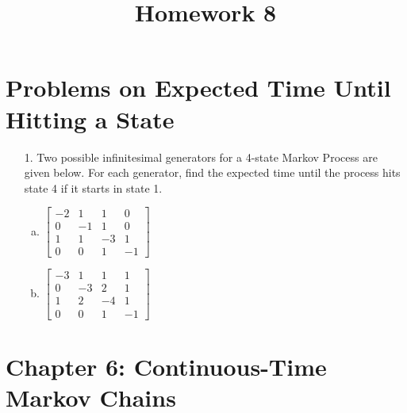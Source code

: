 \documentclass{article}
\begin{document}
\title{Homework 8}
\maketitle
\thispagestyle{fancy}

\section*{Problems on Expected Time Until Hitting a State}

\begin{itemize}
	\item[1.] Two possible infinitesimal generators for a 4-state Markov Process are given below. For each generator, find the expected time until the process hits state 4 if it starts in state 1.
		\begin{enumerate}[(a)]
			\item $\begin{bmatrix}
					-2 & 1 & 1 & 0 \\ 
					0 & -1 & 1 & 0 \\
					1 & 1 & -3 & 1 \\
					0 & 0 & 1 & -1
				\end{bmatrix}$

			\item $\begin{bmatrix}
					-3 & 1 & 1 & 1 \\
					0 & -3 & 2 & 1 \\
					1 & 2 & -4 & 1 \\
					0 & 0 & 1 & -1
				\end{bmatrix}$
				
		\end{enumerate}

\end{itemize}

\section*{Chapter 6: Continuous-Time Markov Chains}
\end{document}
